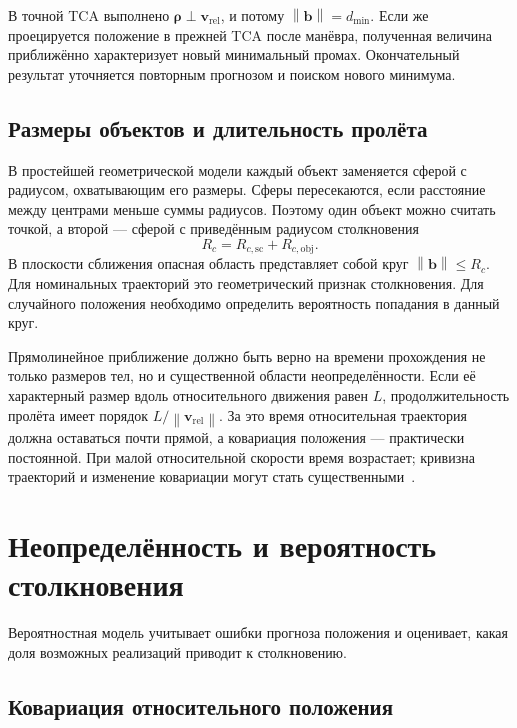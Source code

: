 \documentclass[a4paper,11pt]{article}
\newcommand{\vect}[1]{\boldsymbol{#1}}
\newcommand{\norm}[1]{\left\lVert#1\right\rVert}
\numberwithin{equation}{section}
\begin{document}
В точной TCA выполнено $\vect\rho\perp\vect v_{\mathrm{rel}}$,
и потому $\norm{\vect b}=d_{\min}$. Если же проецируется положение
в прежней TCA после манёвра, полученная величина приближённо
характеризует новый минимальный промах. Окончательный результат
уточняется повторным прогнозом и поиском нового минимума.

\subsection{Размеры объектов и длительность пролёта}

В простейшей геометрической модели каждый объект заменяется
сферой с радиусом, охватывающим его размеры. Сферы пересекаются,
если расстояние между центрами меньше суммы радиусов. Поэтому
один объект можно считать точкой, а второй --- сферой
с приведённым радиусом столкновения
\begin{equation}
R_c=R_{c,\mathrm{sc}}+R_{c,\mathrm{obj}}.
\label{eq:combined-radius}
\end{equation}
В плоскости сближения опасная область представляет собой круг
$\norm{\vect b}\leqslant R_c$. Для номинальных траекторий это
геометрический признак столкновения. Для случайного положения
необходимо определить вероятность попадания в данный круг.

Прямолинейное приближение должно быть верно на времени прохождения
не только размеров тел, но и существенной области неопределённости.
Если её характерный размер вдоль относительного движения равен
$L$, продолжительность пролёта имеет порядок
$L/\norm{\vect v_{\mathrm{rel}}}$. За это время относительная
траектория должна оставаться почти прямой, а ковариация положения
--- практически постоянной. При малой относительной скорости
время возрастает; кривизна траекторий и изменение ковариации
могут стать существенными~\cite{li,nasa}.

\section{Неопределённость и вероятность столкновения}
\label{sec:probability}

Вероятностная модель учитывает ошибки прогноза положения и
оценивает, какая доля возможных реализаций приводит к столкновению.

\subsection{Ковариация относительного положения}
\end{document}
